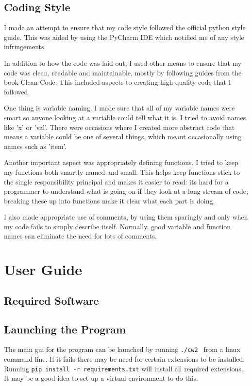 \documentclass[11pt]{report}
\begin{document}
\section{Coding Style}
I made an attempt to ensure that my code style followed the official python style guide\cite{_pep_????}.  This was aided by using the PyCharm IDE\cite{_pycharm_????} which notified me of any style infringements.

In addition to how the code was laid out, I used other means to ensure that my code was clean, readable and maintainable, mostly by following guides from the book Clean Code\cite{martin_clean_2008}.  This included aspects to creating high quality code that I followed.

One thing is variable naming.  I made sure that all of my variable names were smart so anyone looking at a variable could tell what it is.  I tried to avoid names like 'x' or 'val'.  There were occasions where I created more abstract code that means a variable could be one of several things, which meant occasionally using names such as 'item'.

Another important aspect was appropriately defining functions.  I tried to keep my functions both smartly named and small.  This helps keep functions stick to the single responsibility principal and makes it easier to read:  its hard for a programmer to understand what is going on if they look at a long stream of code; breaking these up into functions make it clear what each part is doing.

I also made appropriate use of comments, by using them sparingly and only when my code fails to simply describe itself.  Normally, good variable and function names can eliminate the need for lots of comments.


\chapter{User Guide}
\section{Required Software}

\section{Launching the Program}
The main gui for the program can be launched by running \lstinline{./cw2 } from a linux command line.  If it fails there may be need for certain extensions to be installed.  Running \lstinline{pip install -r requirements.txt} will install all required extensions.  It may be a good idea to set-up a virtual environment\cite{_virtual_????} to do this.
\end{document}
